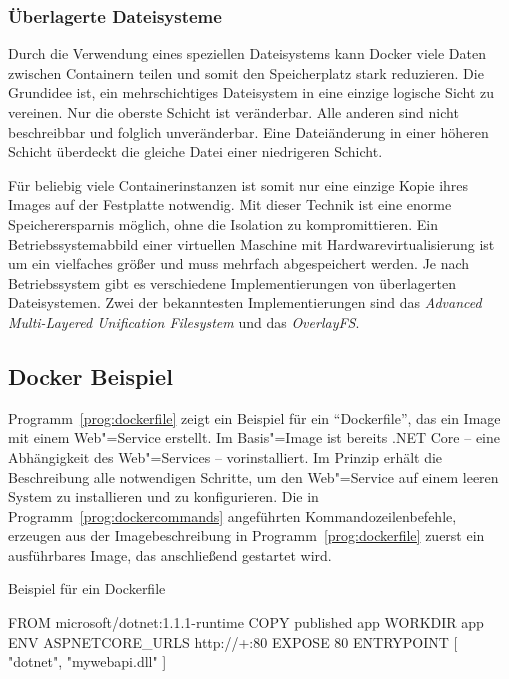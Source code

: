 \subsubsection{Überlagerte Dateisysteme}

Durch die Verwendung eines speziellen Dateisystems kann Docker viele Daten zwischen Containern teilen und somit den Speicherplatz stark reduzieren. Die Grundidee ist, ein mehrschichtiges Dateisystem in eine einzige logische Sicht zu vereinen. Nur die oberste Schicht ist veränderbar. Alle anderen sind nicht beschreibbar und folglich unveränderbar. Eine Dateiänderung in einer höheren Schicht überdeckt die gleiche Datei einer niedrigeren Schicht.

Für beliebig viele Containerinstanzen ist somit nur eine einzige Kopie ihres Images auf der Festplatte notwendig. Mit dieser Technik ist eine enorme Speicherersparnis möglich, ohne die Isolation zu kompromittieren. Ein Betriebssystemabbild einer virtuellen Maschine mit Hardwarevirtualisierung ist um ein vielfaches größer und muss mehrfach abgespeichert werden. Je nach Betriebssystem gibt es verschiedene Implementierungen von überlagerten Dateisystemen. Zwei der bekanntesten Implementierungen sind das \textit{Advanced Multi-Layered Unification File\-system} und das \textit{OverlayFS}.

\subsection{Docker Beispiel}

Programm~\ref{prog:dockerfile} zeigt ein Beispiel für ein "`Dockerfile"', das ein Image mit einem Web"=Service erstellt. Im Basis"=Image ist bereits .NET Core -- eine Abhängigkeit des Web"=Services -- vorinstalliert. Im Prinzip erhält die Beschreibung alle notwendigen Schritte, um den Web"=Service auf einem leeren System zu installieren und zu konfigurieren. Die in Programm~\ref{prog:dockercommands} angeführten Kommandozeilenbefehle, erzeugen aus der Imagebeschreibung in Programm~\ref{prog:dockerfile} zuerst ein ausführbares Image, das anschließend gestartet wird.

\begin{program}[!hbt]
\caption{Beispiel für ein Dockerfile}
\label{prog:dockerfile}
\begin{DockerCode}
FROM microsoft/dotnet:1.1.1-runtime
COPY published app
WORKDIR app
ENV ASPNETCORE_URLS http://+:80 
EXPOSE 80
ENTRYPOINT [ "dotnet", "mywebapi.dll" ]
\end{DockerCode}
\end{program}

